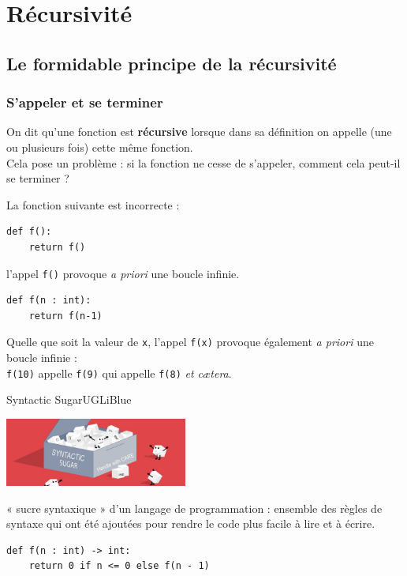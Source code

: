 \documentclass[10pt,firamath,cours]{nsi}
\begin{document}
\chapter{Récursivité}
\section{Le formidable principe de la récursivité}



%

\subsection{S'appeler et se terminer}
On dit qu'une fonction est \textbf{récursive} lorsque dans sa définition on appelle (une ou plusieurs fois)
cette même fonction.\\

Cela pose un problème : si la fonction ne cesse de s'appeler, comment
cela peut-il se terminer ?


%

\begin{exemple}[ 1]
    La fonction suivante est incorrecte :
    \begin{verbatim}
def f():
    return f()
\end{verbatim}
    
    l'appel \texttt{f()} provoque \textit{a priori} une boucle infinie.
\end{exemple}

\begin{exemple}[ 2]
    \begin{verbatim}
def f(n : int):
    return f(n-1)
\end{verbatim}
    
    Quelle que soit la valeur de \texttt{x}, l'appel \texttt{f(x)} provoque également \textit{a priori} une boucle infinie :\\
    \texttt{f(10)} appelle \texttt{f(9)} qui appelle \texttt{f(8)} \textit{et c\ae tera}.
    
\end{exemple}

\begin{encadrecolore}{Syntactic Sugar}{UGLiBlue}
    \begin{center}
        \includegraphics[width=6cm]{img/syntactic_sugar}
    \end{center}
    « sucre syntaxique » d'un langage de programmation : ensemble des règles de syntaxe qui ont été ajoutées pour rendre le code plus facile à lire et à écrire.
    \begin{verbatim}
def f(n : int) -> int:
    return 0 if n <= 0 else f(n - 1)
\end{verbatim}
\end{encadrecolore}
\end{document}
